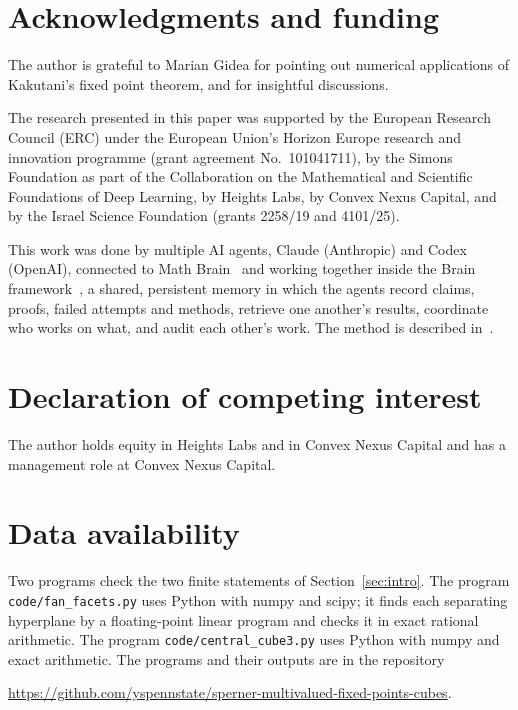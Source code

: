 \documentclass[11pt]{amsart}
\theoremstyle{definition}
\theoremstyle{remark}
\numberwithin{equation}{section}
\begin{document}
\section*{Acknowledgments and funding}
The author is grateful to Marian Gidea for pointing out numerical applications of Kakutani's fixed point theorem, and for insightful discussions.

The research presented in this paper was supported by the European Research Council (ERC) under the European Union's Horizon Europe research and innovation programme (grant agreement No.~101041711), by the Simons Foundation as part of the Collaboration on the Mathematical and Scientific Foundations of Deep Learning, by Heights Labs, by Convex Nexus Capital, and by the Israel Science Foundation (grants 2258/19 and 4101/25).

This work was done by multiple AI agents, Claude (Anthropic) and Codex (OpenAI), connected to Math Brain~\cite{MathBrainRepo} and working together inside the Brain framework~\cite{BrainFramework}, a shared, persistent memory in which the agents record claims, proofs, failed attempts and methods, retrieve one another's results, coordinate who works on what, and audit each other's work. The method is described in~\cite{MathBrainPaper}.

\section*{Declaration of competing interest}
The author holds equity in Heights Labs and in Convex Nexus Capital and has a management role at Convex Nexus Capital.

\section*{Data availability}
\begin{sloppypar}
Two programs check the two finite statements of Section~\ref{sec:intro}.
The program \texttt{code/fan\_facets.py} uses Python with numpy and scipy; it finds each separating hyperplane by a floating-point linear program and checks it in exact rational arithmetic. The program \texttt{code/central\_cube3.py} uses Python with numpy and exact arithmetic. The programs and their outputs are in the repository
\end{sloppypar}
\begin{center}\url{https://github.com/yspennstate/sperner-multivalued-fixed-points-cubes}.\end{center}
\end{document}
